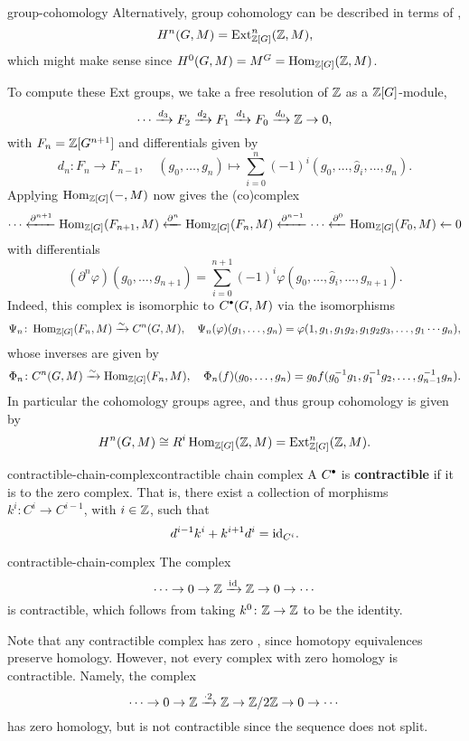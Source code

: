 \begin{example}{group-cohomology}
    Alternatively, group cohomology can be described in terms of ,
    \[ H^n(G, M) = \textup{Ext}^n_{\mathbb{Z}[G]}(\mathbb{Z}, M) , \]
    which might make sense since $H^0(G, M) = M^G = \operatorname{Hom}_{\mathbb{Z}[G]}(\mathbb{Z}, M)$.
    
    To compute these Ext groups, we take a free resolution of $\mathbb{Z}$ as a $\mathbb{Z}[G]$-module,
    \[ \cdots \xrightarrow{d_3} F_2 \xrightarrow{d_2} F_1 \xrightarrow{d_1} F_0 \xrightarrow{d_0} \mathbb{Z} \to 0 , \]
    with $F_n = \mathbb{Z}[G^{n + 1}]$ and differentials given by
    \[ d_n \colon F_n \to F_{n - 1}, \quad (g_0, \ldots, g_n) \mapsto \sum_{i = 0}^{n} (-1)^i (g_0, \ldots, \widehat{g}_i, \ldots, g_n) . \]
    Applying $\operatorname{Hom}_{\mathbb{Z}[G]}(-, M)$ now gives the (co)complex
    \[ \cdots \xleftarrow{\partial^{n + 1}} \operatorname{Hom}_{\mathbb{Z}[G]}(F_{n + 1}, M) \xleftarrow{\partial^n} \operatorname{Hom}_{\mathbb{Z}[G]}(F_n, M) \xleftarrow{\partial^{n - 1}} \cdots \xleftarrow{\partial^0} \operatorname{Hom}_{\mathbb{Z}[G]}(F_0, M) \leftarrow 0 \]
    with differentials
    \[ (\partial^n \varphi)(g_0, \ldots, g_{n + 1}) = \sum_{i = 0}^{n + 1} (-1)^i \varphi(g_0, \ldots, \widehat{g}_i, \ldots, g_{n + 1}) . \]
    Indeed, this complex is isomorphic to $C^\bdot(G, M)$ via the isomorphisms
    \[ \Psi_n \colon \operatorname{Hom}_{\mathbb{Z}[G]}(F_n, M) \xrightarrow{\sim} C^n(G, M), \quad \Psi_n(\varphi)(g_1, \ldots, g_n) = \varphi(1, g_1, g_1 g_2, g_1 g_2 g_3, \ldots, g_1 \cdots g_n ) , \]
    whose inverses are given by
    \[ \Phi_n \colon C^n(G, M) \xrightarrow{\sim} \operatorname{Hom}_{\mathbb{Z}[G]}(F_n, M), \quad \Phi_n(f)(g_0, \ldots, g_n) = g_0 f(g_0^{-1} g_1, g_1^{-1} g_2, \ldots, g_{n - 1}^{-1} g_n) . \]
    In particular the cohomology groups agree, and thus group cohomology is given by
    \[ H^n(G, M) \cong R^i \operatorname{Hom}_{\mathbb{Z}[G]}(\mathbb{Z}, M) = \textup{Ext}^n_{\mathbb{Z}[G]}(\mathbb{Z}, M) . \]
\end{example}

\begin{topic}{contractible-chain-complex}{contractible chain complex}
    A  $C^\bdot$ is \textbf{contractible} if it is  to the zero complex. That is, there exist a collection of morphisms $k^i \colon C^i \to C^{i - 1}$, with $i \in \mathbb{Z}$, such that
    \[ d^{i - 1} k^i + k^{i + 1} d^i = \textup{id}_{C^i} . \]
\end{topic}

\begin{example}{contractible-chain-complex}
    The complex
    \[ \cdots \to 0 \to \mathbb{Z} \xrightarrow{\textup{id}} \mathbb{Z} \to 0 \to \cdots \]
    is contractible, which follows from taking $k^0 \colon \mathbb{Z} \to \mathbb{Z}$ to be the identity.
    
    Note that any contractible complex has zero , since homotopy equivalences preserve homology. However, not every complex with zero homology is contractible. Namely, the complex
    \[ \cdots \to 0 \to \mathbb{Z} \xrightarrow{\cdot 2} \mathbb{Z} \to \mathbb{Z} / 2\mathbb{Z} \to 0 \to \cdots \]
    has zero homology, but is not contractible since the sequence does not split.
\end{example}

